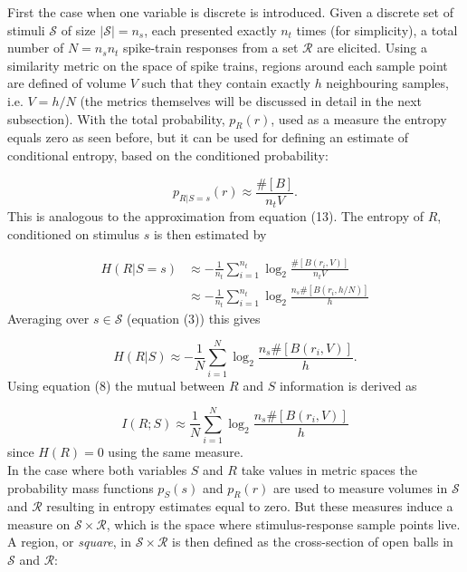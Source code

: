 \documentclass[12pt]{extarticle}
\begin{document}
\noindent
First the case when one variable is discrete is introduced. Given a discrete set of stimuli $\mathcal{S}$ of size $|\mathcal{S}|=n_s$, each presented exactly $n_t$ times (for simplicity), a total number of $N=n_sn_t$ spike-train responses from a set $\mathcal{R}$ are elicited. Using a similarity metric on the space of spike trains, regions around each sample point are defined of volume $V$ such that they contain exactly $h$ neighbouring samples, i.e. $V=h/N$ (the metrics themselves will be discussed in detail in the next subsection). With the total probability, $p_R(r)$, used as a measure the entropy equals zero as seen before, but it can be used for defining an estimate of conditional entropy, based on the conditioned probability: 

\begin{equation}
p_{R|S=s}(r) \approx \frac{\#[B]}{n_tV}.
\end{equation}
This is analogous to the approximation from equation (13). The entropy of $R$, conditioned on stimulus $s$ is then estimated by

\begin{equation}
\begin{aligned}
H(R|S=s) &\approx - \frac{1}{n_t} \sum_{i=1}^{n_t} \log_2 \frac{\#[B(r_i, V)]}{n_tV} \\
         &\approx - \frac{1}{n_t} \sum_{i=1}^{n_t} \log_2 \frac{n_s\#[B(r_i, h/N)]}{h}
\end{aligned}
\end{equation}
Averaging over $s \in \mathcal{S}$ (equation (3)) this gives

\begin{equation}
H(R|S) \approx - \frac{1}{N} \sum_{i=1}^{N} \log_2 \frac{n_s\#[B(r_i, V)]}{h}.
\end{equation}
Using equation (8) the mutual between $R$ and $S$ information is derived as

\begin{equation}
I(R;S) \approx \frac{1}{N} \sum_{i=1}^{N} \log_2 \frac{n_s\#[B(r_i, V)]}{h}
\end{equation}
since $H(R)=0$ using the same measure.\\

\noindent
In the case where both variables $S$ and $R$ take values in metric spaces the probability mass functions $p_S(s)$ and $p_R(r)$ are used to measure volumes in $\mathcal{S}$ and $\mathcal{R}$ resulting in entropy estimates equal to zero. But these measures induce a measure on $\mathcal{S} \times \mathcal{R}$, which is the space where stimulus-response sample points live. A region, or \textit{square}, in $\mathcal{S} \times \mathcal{R}$ is then defined as the cross-section of open balls in $\mathcal{S}$ and $\mathcal{R}$:
\end{document}
